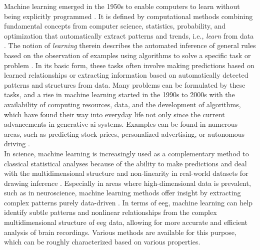 Machine learning emerged in the 1950s to enable computers to learn without being explicitly programmed \cite{Samual1959}. It is defined by computational methods combining fundamental concepts from computer science, statistics, probability, and optimization that automatically extract patterns and trends, i.e., \textit{learn} from data \cite{Hastie2009}. The notion of \textit{learning} therein describes the automated inference of general rules based on the observation of examples using algorithms to solve a specific task or problem \cite{Von_luxburg2011}. In its basic form, these tasks often involve making predictions based on learned relationships or extracting information based on automatically detected patterns and structures from data. Many problems can be formulated by these tasks, and a rise in machine learning started in the 1990s to 2000s with the availability of computing resources, data, and the development of algorithms, which have found their way into everyday life not only since the current advancements in generative \gls{ai} systems. Examples can be found in numerous areas, such as predicting stock prices, personalized advertising, or autonomous driving \cite{Rudin2014}.\\
In science, machine learning is increasingly used as a complementary method to classical statistical analyses because of the ability to make predictions and deal with the multidimensional structure and non-linearity in real-world datasets for drawing inference \cite{Bzdok2018}. Especially in areas where high-dimensional data is prevalent, such as in neuroscience, machine learning methods offer insight by extracting complex patterns purely data-driven \cite{Brunton2019}. In terms of \gls{eeg}, machine learning can help identify subtle patterns and nonlinear relationships from the complex multidimensional structure of \gls{eeg} data, allowing for more accurate and efficient analysis of brain recordings. Various methods are available for this purpose, which can be roughly characterized based on various properties. 


